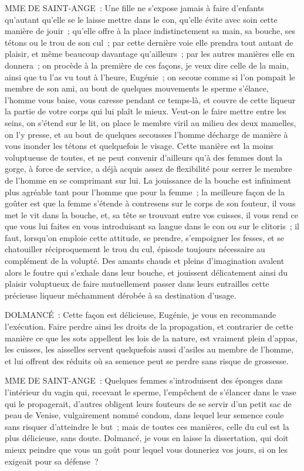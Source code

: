 \documentclass[french,twoside]{book} %
\begin{document}
MME DE SAINT-ANGE : Une fille ne s’expose jamais à faire d’enfants qu’autant qu’elle se le laisse mettre dans le con, qu’elle évite avec soin cette manière de jouir ; qu’elle offre à la place indistinctement sa main, sa bouche, ses tétons ou le trou de son cul ; par cette dernière voie elle prendra tout autant de plaisir, et même beaucoup davantage qu’ailleurs ; par les autres manières elle en donnera ; on procède à la première de ces façons, je veux dire celle de la main, ainsi que tu l’as vu tout à l’heure, Eugénie ; on secoue comme si l’on pompait le membre de son ami, au bout de quelques mouvements le sperme s’élance, l’homme vous baise, vous caresse pendant ce temps-là, et couvre de cette liqueur la partie de votre corps qui lui plaît le mieux. Veut-on le faire mettre entre les seins, on s’étend sur le lit, on place le membre viril au milieu des deux mamelles, on l’y presse, et au bout de quelques secousses l’homme décharge de manière à vous inonder les tétons et quelquefois le visage. Cette manière est la moins voluptueuse de toutes, et ne peut convenir d’ailleurs qu’à des femmes dont la gorge, à force de service, a déjà acquis assez de flexibilité pour serrer le membre de l’homme en se comprimant sur lui. La jouissance de la bouche est infiniment plus agréable tant pour l’homme que pour la femme ; la meilleure façon de la goûter est que la femme s’étende à contresens sur le corps de son fouteur, il vous met le vit dans la bouche, et, sa tête se trouvant entre vos cuisses, il vous rend ce que vous lui faites en vous introduisant sa langue dans le con ou sur le clitoris ; il faut, lorsqu’on emploie cette attitude, se prendre, s’empoigner les fesses, et se chatouiller réciproquement le trou du cul, épisode toujours nécessaire au complément de la volupté. Des amants chauds et pleins d’imagination avalent alors le foutre qui s’exhale dans leur bouche, et jouissent délicatement ainsi du plaisir voluptueux de faire mutuellement passer dans leurs entrailles cette précieuse liqueur méchamment dérobée à sa destination d’usage.\par
DOLMANCÉ : Cette façon est délicieuse, Eugénie, je vous en recommande l’exécution. Faire perdre ainsi les droits de la propagation, et contrarier de cette manière ce que les sots appellent les lois de la nature, est vraiment plein d’appas, les cuisses, les aisselles servent quelquefois aussi d’asiles au membre de l’homme, et lui offrent des réduits où sa semence peut se perdre sans risque de grossesse.\par
MME DE SAINT-ANGE : Quelques femmes s’introduisent des éponges dans l’intérieur du vagin qui, recevant le sperme, l’empêchent de s’élancer dans le vase qui le propagerait, d’autres obligent leurs fouteurs de se servir d’un petit sac de peau de Venise, vulgairement nommé condom, dans lequel leur semence coule sans risquer d’atteindre le but ; mais de toutes ces manières, celle du cul est la plus délicieuse, sans doute. Dolmancé, je vous en laisse la dissertation, qui doit mieux peindre que vous un goût pour lequel vous donneriez vos jours, si on les exigeait pour sa défense ?\par
\end{document}
